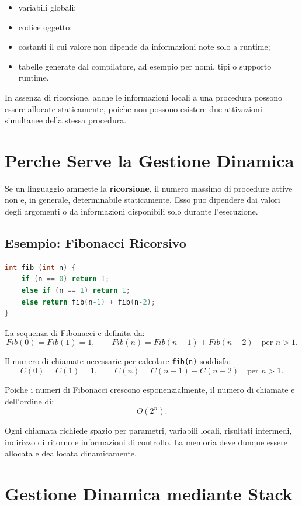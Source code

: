 \documentclass{article}
\begin{document}
\begin{itemize}
  \item variabili globali;
  \item codice oggetto;
  \item costanti il cui valore non dipende da informazioni note solo a runtime;
  \item tabelle generate dal compilatore, ad esempio per nomi, tipi o supporto runtime.
\end{itemize}

In assenza di ricorsione, anche le informazioni locali a una procedura possono essere allocate staticamente, poiche non possono esistere due attivazioni simultanee della stessa procedura.

\section{Perche Serve la Gestione Dinamica}

Se un linguaggio ammette la \textbf{ricorsione}, il numero massimo di procedure attive non e, in generale, determinabile staticamente. Esso puo dipendere dai valori degli argomenti o da informazioni disponibili solo durante l'esecuzione.

\subsection{Esempio: Fibonacci Ricorsivo}

\begin{lstlisting}[language=C]
int fib (int n) {
    if (n == 0) return 1;
    else if (n == 1) return 1;
    else return fib(n-1) + fib(n-2);
}
\end{lstlisting}

La sequenza di Fibonacci e definita da:
\[
Fib(0)=Fib(1)=1,
\qquad
Fib(n)=Fib(n-1)+Fib(n-2) \quad \text{per } n>1.
\]

Il numero di chiamate necessarie per calcolare \texttt{fib(n)} soddisfa:
\[
C(0)=C(1)=1,
\qquad
C(n)=C(n-1)+C(n-2) \quad \text{per } n>1.
\]

Poiche i numeri di Fibonacci crescono esponenzialmente, il numero di chiamate e dell'ordine di:
\[
O(2^n).
\]

Ogni chiamata richiede spazio per parametri, variabili locali, risultati intermedi, indirizzo di ritorno e informazioni di controllo. La memoria deve dunque essere allocata e deallocata dinamicamente.

\section{Gestione Dinamica mediante Stack}
\end{document}
